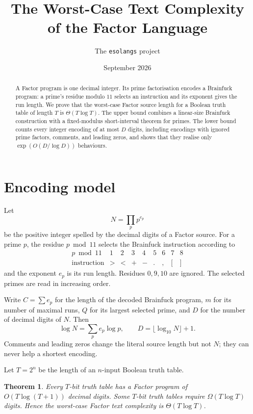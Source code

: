 \documentclass[10pt]{article}
\title{The Worst-Case Text Complexity of the Factor Language}
\author{The \texttt{esolangs} project}
\date{September 2026}
\newtheorem{theorem}{Theorem}[section]
\theoremstyle{remark}
\begin{document}
\maketitle

\begin{abstract}
A Factor program is one decimal integer.  Its prime factorisation encodes a
Brainfuck program: a prime's residue modulo $11$ selects an instruction and
its exponent gives the run length.  We prove that the worst-case Factor
source length for a Boolean truth table of length $T$ is
$\Theta(T\log T)$.  The upper bound combines a linear-size Brainfuck
construction with a fixed-modulus short-interval theorem for primes.  The
lower bound counts every integer encoding of at most $D$ digits, including
encodings with ignored prime factors, comments, and leading zeros, and shows
that they realise only $\exp(O(D/\log D))$ behaviours.
\end{abstract}

\section{Encoding model}

Let
\[
  N=\prod_p p^{e_p}
\]
be the positive integer spelled by the decimal digits of a Factor source.
For a prime $p$, the residue $p\bmod 11$ selects the Brainfuck instruction
according to
\[
\begin{array}{c|cccccccc}
p\bmod 11&1&2&3&4&5&6&7&8\\ \hline
\text{instruction}&>&<&+&-&.&,&[&]
\end{array}
\]
and the exponent $e_p$ is its run length.  Residues $0,9,10$ are ignored.
The selected primes are read in increasing order.

Write $C=\sum e_p$ for the length of the decoded Brainfuck program, $m$ for
its number of maximal runs, $Q$ for its largest selected prime, and $D$ for
the number of decimal digits of $N$.  Then
\begin{equation}\label{eq:digits}
  \log N=\sum_p e_p\log p,
  \qquad D=\lfloor\log_{10}N\rfloor+1.
\end{equation}
Comments and leading zeros change the literal source length but not $N$;
they can never help a shortest encoding.

Let $T=2^n$ be the length of an $n$-input Boolean truth table.

\begin{theorem}\label{thm:main}
Every $T$-bit truth table has a Factor program of
$O(T\log(T+1))$ decimal digits.  Some $T$-bit truth tables require
$\Omega(T\log T)$ digits.  Hence the worst-case Factor text complexity is
$\Theta(T\log T)$.
\end{theorem}
\end{document}
